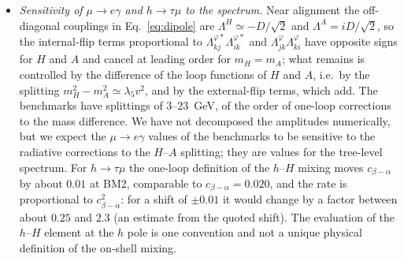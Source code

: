 \documentclass[twocolumn,epjc3]{svjour3}
\begin{document}
\begin{itemize}
\item \emph{Sensitivity of $\mu\to e\gamma$ and $h\to\tau\mu$ to the spectrum.} Near alignment the off-diagonal couplings in Eq.~\eqref{eq:dipole} are $\Lambda^H\simeq-D/\sqrt2$ and $\Lambda^A=iD/\sqrt2$, so the internal-flip terms proportional to $\Lambda^{\varphi*}_{kj}\Lambda^{\varphi*}_{ik}$ and $\Lambda^\varphi_{jk}\Lambda^\varphi_{ki}$ have opposite signs for $H$ and $A$ and cancel at leading order for $m_H=m_A$; what remains is controlled by the difference of the loop functions of $H$ and $A$, i.e.\ by the splitting $m_H^2-m_A^2\simeq\lambda_5v^2$, and by the external-flip terms, which add. The benchmarks have splittings of $3$--$23$~GeV, of the order of one-loop corrections to the mass difference. We have not decomposed the amplitudes numerically, but we expect the $\mu\to e\gamma$ values of the benchmarks to be sensitive to the radiative corrections to the $H$--$A$ splitting; they are values for the tree-level spectrum. For $h\to\tau\mu$ the one-loop definition of the $h$--$H$ mixing moves $c_{\beta-\alpha}$ by about $0.01$ at BM2, comparable to $c_{\beta-\alpha}=0.020$, and the rate is proportional to $c_{\beta-\alpha}^2$: for a shift of $\pm0.01$ it would change by a factor between about $0.25$ and $2.3$ (an estimate from the quoted shift). The evaluation of the $h$--$H$ element at the $h$ pole is one convention and not a unique physical definition of the on-shell mixing.

\end{itemize}
\end{document}
